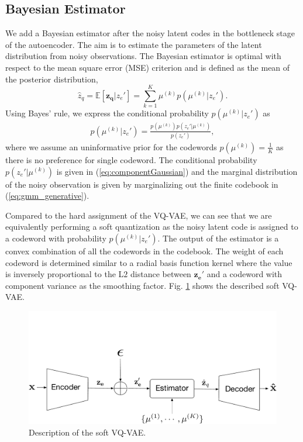 \documentclass[letterpaper]{article} %
\begin{document}
\subsection{Bayesian Estimator}
 We add a Bayesian estimator after the noisy latent codes in the bottleneck stage of the autoencoder. The aim is to estimate the parameters of the latent distribution from noisy observations.
 The Bayesian estimator is optimal with respect to the mean square error (MSE)  criterion and is defined as the mean of the posterior distribution,
\begin{equation}
\label{eq: estimator}
\hat{z}_q = \mathbb{E}[\mathbf{z_q}|z_e'] = \sum_{k = 1}^{K}\mu^{(k)}p\left(\mu^{(k)}|z_e'\right).
\end{equation}
Using Bayes' rule, we express the conditional probability $p\left(\mu^{(k)}|z_e'\right)$  as
\begin{align}
p\left(\mu^{(k)}|z_e'\right) = \frac{p\left(\mu^{(k)}\right)p\left(z_e'|\mu^{(k)}\right)}{p(z_e')},
\end{align}
where we assume an uninformative prior for the codewords $p\left(\mu^{(k)}\right) = \frac{1}{K}$ as there is no preference for single codeword. The conditional probability $p\left(z_e'|\mu^{(k)}\right)$ is given in (\ref{eq:componentGaussian}) and the marginal distribution of the noisy observation is given by marginalizing out the finite codebook in (\ref{eq:gmm_generative}).

Compared to the hard assignment of the VQ-VAE, we can see that we are equivalently performing a soft quantization as the noisy latent code is assigned to a codeword with probability $p\left(\mu^{(k)}|z_e'\right)$. The output of the estimator is a convex combination of all the codewords in the codebook. The weight of each codeword is determined similar to a radial basis function kernel where the value is inversely proportional to the L$2$ distance between $\mathbf{z_e'}$ and a codeword with component variance as the smoothing factor.
Fig. \ref{fig:estimator} shows the described soft VQ-VAE.
\begin{figure}[!ht]
	\centering
	\includegraphics[width=.45\textwidth]{estimatorVQVAE.pdf}
	\caption{Description of the soft VQ-VAE.}
	\label{fig:estimator}
\end{figure}
\end{document}
